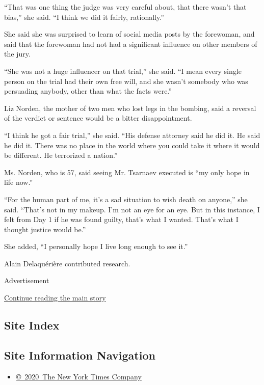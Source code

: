 ``That was one thing the judge was very careful about, that there wasn't
that bias,'' she said. ``I think we did it fairly, rationally.''

She said she was surprised to learn of social media posts by the
forewoman, and said that the forewoman had not had a significant
influence on other members of the jury.

``She was not a huge influencer on that trial,'' she said. ``I mean
every single person on the trial had their own free will, and she wasn't
somebody who was persuading anybody, other than what the facts were.''

Liz Norden, the mother of two men who lost legs in the bombing, said a
reversal of the verdict or sentence would be a bitter disappointment.

``I think he got a fair trial,'' she said. ``His defense attorney said
he did it. He said he did it. There was no place in the world where you
could take it where it would be different. He terrorized a nation.''

Ms. Norden, who is 57, said seeing Mr. Tsarnaev executed is ``my only
hope in life now.''

``For the human part of me, it's a sad situation to wish death on
anyone,'' she said. ``That's not in my makeup. I'm not an eye for an
eye. But in this instance, I felt from Day 1 if he was found guilty,
that's what I wanted. That's what I thought justice would be.''

She added, ``I personally hope I live long enough to see it.''

Alain Delaquérière contributed research.

Advertisement

\protect\hyperlink{after-bottom}{Continue reading the main story}

\hypertarget{site-index}{%
\subsection{Site Index}\label{site-index}}

\hypertarget{site-information-navigation}{%
\subsection{Site Information
Navigation}\label{site-information-navigation}}

\begin{itemize}
\tightlist
\item
  \href{https://help.nytimes.com/hc/en-us/articles/115014792127-Copyright-notice}{©~2020~The
  New York Times Company}
\end{itemize}

